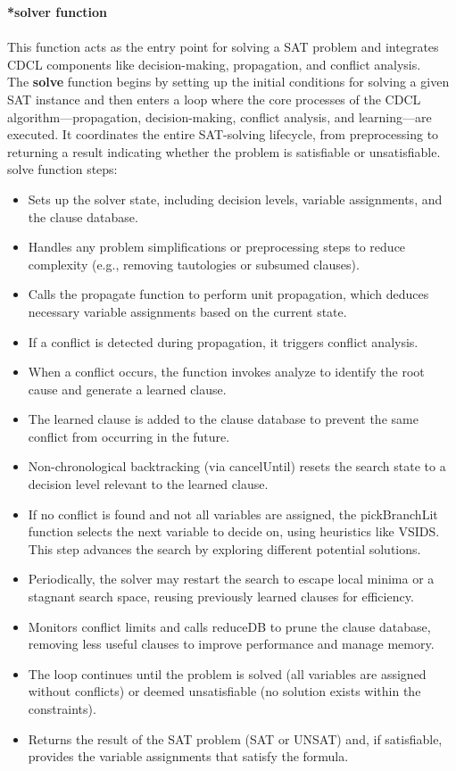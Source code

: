 \documentclass[runningheads]{llncs}
\begin{document}
\textbf{*solver function}
\\
\\
This function acts as the entry point for solving a SAT problem and integrates CDCL components like decision-making, propagation, and conflict analysis.\\

The \textbf{solve} function begins by setting up the initial conditions for solving a given SAT instance and then enters a loop where the core processes of the CDCL algorithm—propagation, decision-making, conflict analysis, and learning—are executed. It coordinates the entire SAT-solving lifecycle, from preprocessing to returning a result indicating whether the problem is satisfiable or unsatisfiable.
\\
solve function steps:
\begin{itemize}
  \item Sets up the solver state, including decision levels, variable assignments, and the clause database.
  \item Handles any problem simplifications or preprocessing steps to reduce complexity (e.g., removing tautologies or subsumed clauses).
  \item Calls the propagate function to perform unit propagation, which deduces necessary variable assignments based on the current state.
  \item If a conflict is detected during propagation, it triggers conflict analysis.
  \item When a conflict occurs, the function invokes analyze to identify the root cause and generate a learned clause.
   \item The learned clause is added to the clause database to prevent the same conflict from occurring in the future.
   \item Non-chronological backtracking (via cancelUntil) resets the search state to a decision level relevant to the learned clause.
   \item If no conflict is found and not all variables are assigned, the pickBranchLit function selects the next variable to decide on, using heuristics like VSIDS. This step advances the search by exploring different potential solutions.
   \item Periodically, the solver may restart the search to escape local minima or a stagnant search space, reusing previously learned clauses for efficiency.
   \item Monitors conflict limits and calls reduceDB to prune the clause database, removing less useful clauses to improve performance and manage memory.
   \item The loop continues until the problem is solved (all variables are assigned without conflicts) or deemed unsatisfiable (no solution exists within the constraints).
   \item Returns the result of the SAT problem (SAT or UNSAT) and, if satisfiable, provides the variable assignments that satisfy the formula.
\end{itemize}
\end{document}
